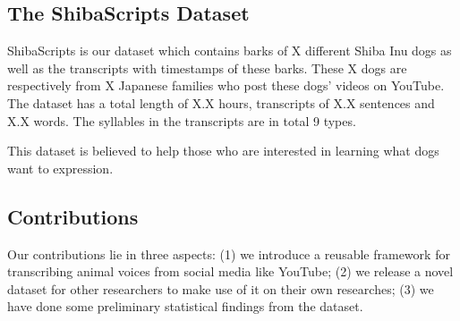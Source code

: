 \subsection*{The ShibaScripts Dataset}
ShibaScripts is our dataset which contains barks of X different Shiba Inu dogs as well as the transcripts with timestamps of these barks. These X dogs are respectively from X Japanese families who post these dogs' videos on YouTube. The dataset has a total length of X.X hours, transcripts of X.X sentences and X.X words. The syllables in the transcripts are in total 9 types.



This dataset is believed to help those who are interested in learning what dogs want to expression.

\subsection*{Contributions}

Our contributions lie in three aspects: (1) we introduce a reusable framework for transcribing animal voices from social media like YouTube; (2) we release a novel dataset for other researchers to make use of it on their own researches; (3) we have done some preliminary statistical findings from the dataset.
